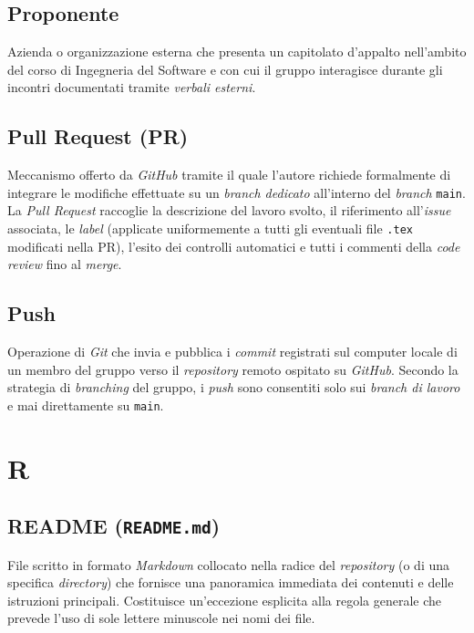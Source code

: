 \documentclass[11pt, a4paper]{article}
\begin{document}
\subsection*{Proponente}
Azienda o organizzazione esterna che presenta un capitolato d'appalto nell'ambito del corso di Ingegneria del Software e con cui il gruppo interagisce durante gli incontri documentati tramite \textit{verbali esterni}.

\subsection*{Pull Request (PR)}
Meccanismo offerto da \textit{GitHub} tramite il quale l'autore richiede formalmente di integrare le modifiche effettuate su un \textit{branch dedicato} all'interno del \textit{branch} \texttt{main}. La \textit{Pull Request} raccoglie la descrizione del lavoro svolto, il riferimento all'\textit{issue} associata, le \textit{label} (applicate uniformemente a tutti gli eventuali file \texttt{.tex} modificati nella PR), l'esito dei controlli automatici e tutti i commenti della \textit{code review} fino al \textit{merge}.

\subsection*{Push}
Operazione di \textit{Git} che invia e pubblica i \textit{commit} registrati sul computer locale di un membro del gruppo verso il \textit{repository} remoto ospitato su \textit{GitHub}. Secondo la strategia di \textit{branching} del gruppo, i \textit{push} sono consentiti solo sui \textit{branch di lavoro} e mai direttamente su \texttt{main}.

\newpage

\section*{R}

\subsection*{README (\texttt{README.md})}
File scritto in formato \textit{Markdown} collocato nella radice del \textit{repository} (o di una specifica \textit{directory}) che fornisce una panoramica immediata dei contenuti e delle istruzioni principali. Costituisce un'eccezione esplicita alla regola generale che prevede l'uso di sole lettere minuscole nei nomi dei file.
\end{document}
